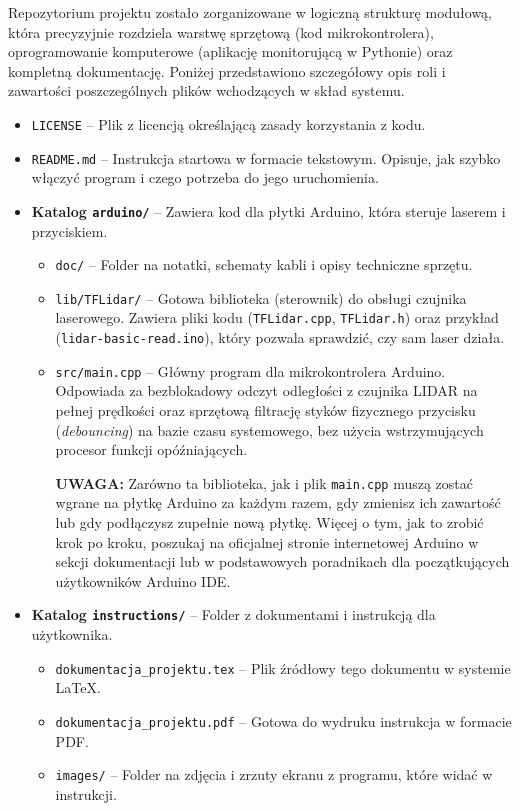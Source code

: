 \documentclass[a4paper,12pt]{article}
\begin{document}
Repozytorium projektu zostało zorganizowane w logiczną strukturę modułową, która precyzyjnie rozdziela warstwę sprzętową (kod mikrokontrolera), oprogramowanie komputerowe (aplikację monitorującą w Pythonie) oraz kompletną dokumentację. Poniżej przedstawiono szczegółowy opis roli i zawartości poszczególnych plików wchodzących w skład systemu.

\begin{itemize}
    \item \lstinline[language=Python]|LICENSE| -- Plik z licencją określającą zasady korzystania z kodu.
    \item \texttt{README.md} -- Instrukcja startowa w formacie tekstowym. Opisuje, jak szybko włączyć program i czego potrzeba do jego uruchomienia.
    \item \textbf{Katalog \texttt{arduino/}} -- Zawiera kod dla płytki Arduino, która steruje laserem i przyciskiem.
    \begin{itemize}
        \item \texttt{doc/} -- Folder na notatki, schematy kabli i opisy techniczne sprzętu.
        \item \texttt{lib/TFLidar/} -- Gotowa biblioteka (sterownik) do obsługi czujnika laserowego. Zawiera pliki kodu (\texttt{TFLidar.cpp}, \texttt{TFLidar.h}) oraz przykład (\texttt{lidar-basic-read.ino}), który pozwala sprawdzić, czy sam laser działa.
        \item \texttt{src/main.cpp} -- Główny program dla mikrokontrolera Arduino. Odpowiada za bezblokadowy odczyt odległości z czujnika LIDAR na pełnej prędkości oraz sprzętową filtrację styków fizycznego przycisku (\textit{debouncing}) na bazie czasu systemowego, bez użycia wstrzymujących procesor funkcji opóźniających.
        
        \vspace{0.3cm}
        \noindent \textbf{UWAGA:} Zarówno ta biblioteka, jak i plik \texttt{main.cpp} muszą zostać wgrane na płytkę Arduino za każdym razem, gdy zmienisz ich zawartość lub gdy podłączysz zupełnie nową płytkę. Więcej o tym, jak to zrobić krok po kroku, poszukaj na oficjalnej stronie internetowej Arduino w sekcji dokumentacji lub w podstawowych poradnikach dla początkujących użytkowników Arduino IDE.
    \end{itemize}
    
    \item \textbf{Katalog \texttt{instructions/}} -- Folder z dokumentami i instrukcją dla użytkownika.
    \begin{itemize}
        \item \texttt{dokumentacja\_projektu.tex} -- Plik źródłowy tego dokumentu w systemie \LaTeX.
        \item \texttt{dokumentacja\_projektu.pdf} -- Gotowa do wydruku instrukcja w formacie PDF.
        \item \texttt{images/} -- Folder na zdjęcia i zrzuty ekranu z programu, które widać w instrukcji.
    \end{itemize}


\end{itemize}
\end{document}
